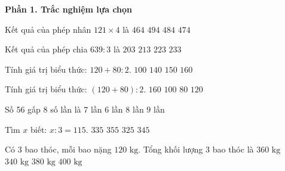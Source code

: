 \textbf{Phần 1. Trắc nghiệm lựa chọn}

\begin{ex} %
Kết quả của phép nhân $121 \times 4$ là
\choice
{$464$}
{$494$}
{\True $484$}
{$474$}
\end{ex}

\begin{ex} %
Kết quả của phép chia $639 : 3$ là
\choice
{$203$}
{\True $213$}
{$223$}
{$233$}
\end{ex}

\begin{ex} %
Tính giá trị biểu thức: $120 + 80 : 2$.
\choice
{$100$}
{$140$}
{$150$}
{\True $160$}
\end{ex}

\begin{ex} %
Tính giá trị biểu thức: $(120 + 80) : 2$.
\choice
{$160$}
{\True $100$}
{$80$}
{$120$}
\end{ex}

\begin{ex} %
Số 56 gấp 8 số lần là
\choice
{\True $7$ lần}
{$6$ lần}
{$8$ lần}
{$9$ lần}
\end{ex}

\begin{ex} %
Tìm $x$ biết: $x : 3 = 115$.
\choice
{$335$}
{$355$}
{$325$}
{\True $345$}
\end{ex}

\begin{ex} %
Có 3 bao thóc, mỗi bao nặng $120\text{ kg}$. Tổng khối lượng 3 bao thóc là
\choice
{\True $360\text{ kg}$}
{$340\text{ kg}$}
{$380\text{ kg}$}
{$400\text{ kg}$}
\end{ex}

